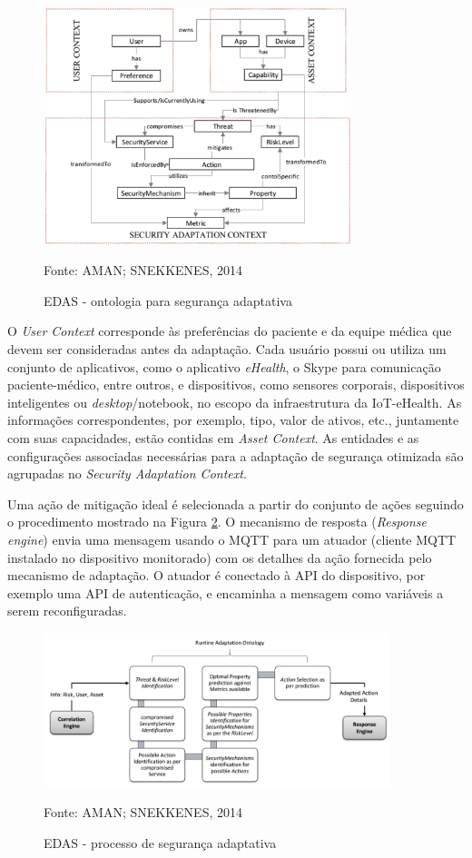 \documentclass[tid,table]{texufpel} %
\begin{document}
\begin{figure}[ht]
\centering
\includegraphics[width=0.8\textwidth]{imagens/edas-ontology.png}
\caption{EDAS - ontologia para segurança adaptativa}
\label{edas-ontology}
Fonte: AMAN; SNEKKENES, 2014
\end{figure}


O \textit{User Context} corresponde às preferências do paciente e da equipe médica que devem ser consideradas antes da adaptação. Cada usuário possui ou utiliza um conjunto de aplicativos, como o aplicativo \textit{eHealth}, o Skype para comunicação paciente-médico, entre outros, e dispositivos, como sensores corporais, dispositivos inteligentes ou \textit{desktop}/notebook, no escopo da infraestrutura da IoT-eHealth. As informações correspondentes, por exemplo, tipo, valor de ativos, etc., juntamente com suas capacidades, estão contidas em \textit{Asset Context}. As entidades e as configurações associadas necessárias para a adaptação de segurança otimizada são agrupadas no \textit{Security Adaptation Context}.

Uma ação de mitigação ideal é selecionada a partir do conjunto de ações seguindo o procedimento mostrado na Figura \ref{edas-adaptation-process}. O mecanismo de resposta (\textit{Response engine}) envia uma mensagem usando o MQTT para um atuador (cliente MQTT instalado no dispositivo monitorado) com os detalhes da ação fornecida pelo mecanismo de adaptação. O atuador é conectado à API do dispositivo, por exemplo uma API de autenticação, e encaminha a mensagem como variáveis a serem reconfiguradas.

\begin{figure}[ht]
\centering
\includegraphics[width=0.9\textwidth]{imagens/edas-adaptation-process.png}
\caption{EDAS - processo de segurança adaptativa}
\label{edas-adaptation-process}
Fonte: AMAN; SNEKKENES, 2014
\end{figure}
\end{document}
